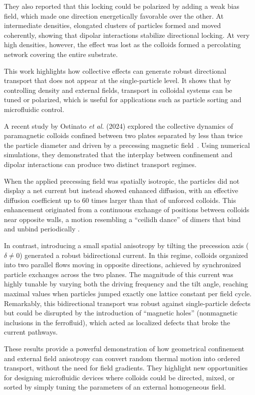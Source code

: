 They also reported that this locking could be polarized by adding a weak bias field, which made one direction energetically favorable over the other. At intermediate densities, elongated clusters of particles formed and moved coherently, showing that dipolar interactions stabilize directional locking. At very high densities, however, the effect was lost as the colloids formed a percolating network covering the entire substrate.

This work highlights how collective effects can generate robust directional transport that does not appear at the single-particle level. It shows that by controlling density and external fields, transport in colloidal systems can be tuned or polarized, which is useful for applications such as particle sorting and microfluidic control. 


A recent study by Ostinato \textit{et al.} (2024) explored the collective dynamics of paramagnetic colloids confined between two plates separated by less than twice the particle diameter and driven by a precessing magnetic field~\cite{ostinato2024magnetically}. Using numerical simulations, they demonstrated that the interplay between confinement and dipolar interactions can produce two distinct transport regimes.

When the applied precessing field was spatially isotropic, the particles did not display a net current but instead showed enhanced diffusion, with an effective diffusion coefficient up to 60 times larger than that of unforced colloids. This enhancement originated from a continuous exchange of positions between colloids near opposite walls, a motion resembling a ``ceilidh dance'' of dimers that bind and unbind periodically \cite{ostinato2024magnetically}. 

In contrast, introducing a small spatial anisotropy by tilting the precession axis ($\delta \neq 0$) generated a robust bidirectional current. In this regime, colloids organized into two parallel flows moving in opposite directions, achieved by synchronized particle exchanges across the two planes. The magnitude of this current was highly tunable by varying both the driving frequency and the tilt angle, reaching maximal values when particles jumped exactly one lattice constant per field cycle. Remarkably, this bidirectional transport was robust against single-particle defects but could be disrupted by the introduction of ``magnetic holes'' (nonmagnetic inclusions in the ferrofluid), which acted as localized defects that broke the current pathways.

These results provide a powerful demonstration of how geometrical confinement and external field anisotropy can convert random thermal motion into ordered transport, without the need for field gradients. They highlight new opportunities for designing microfluidic devices where colloids could be directed, mixed, or sorted by simply tuning the parameters of an external homogeneous field.

\newpage
